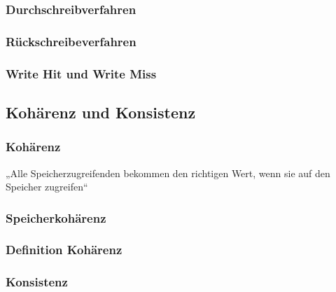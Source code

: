 \subsubsection*{Durchschreibverfahren}
\subsubsection*{Rückschreibeverfahren}
\subsubsection*{Write Hit und Write Miss}

\subsection{Kohärenz und Konsistenz}
\subsubsection{Kohärenz}
„Alle Speicherzugreifenden bekommen den richtigen Wert, wenn sie auf den Speicher zugreifen“

\subsubsection*{Speicherkohärenz}

\subsubsection*{Definition Kohärenz}

\subsubsection{Konsistenz}



